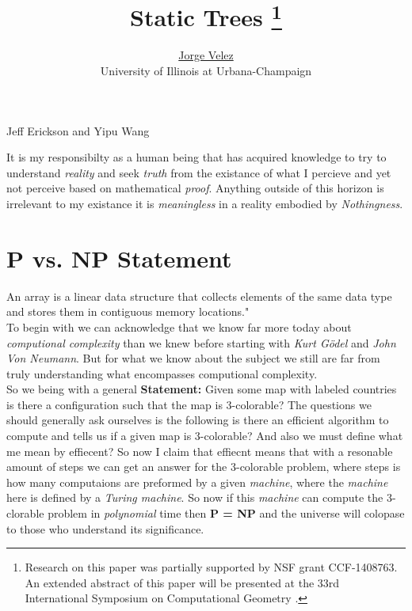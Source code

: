 \documentclass[twoside,11pt]{article}
\numberwithin{figure}{section}
\begin{document}
\pagestyle{myheadings}
    {Jeff Erickson and Yipu Wang}

\begin{titlepage}

\title{Static Trees%
\thanks{Research on this paper was partially supported by NSF grant CCF-1408763.  An extended abstract of this paper will be presented at the 33rd International Symposium on Computational Geometry \cite{ccwx}.}}

\author{\href{http://jeffe.cs.illinois.edu}{Jorge Velez}\\[1ex]
University of Illinois at Urbana-Champaign}

\maketitle
It is my responsibilty as a human being that has acquired knowledge to try to understand \emph{reality} and seek \emph{truth} from the existance of what I percieve and yet not perceive based
on mathematical \emph{proof}. Anything outside of this horizon is irrelevant to my existance it is \emph{meaningless} in a reality embodied by \emph{Nothingness}. 
\end{titlepage}

\tableofcontents

\section{P vs. NP Statement}
An array is a linear data structure that collects elements of the same data type and stores them in contiguous memory locations." \\ 
To begin with we can acknowledge that we know far more today about \emph{computional complexity} than we knew before starting with \emph{Kurt Gödel} and \emph{John Von Neumann}. 
But for what we know about the subject we still are far from truly understanding what encompasses computional complexity. \\

So we being with a general \textbf{Statement:} Given some map with labeled countries is there a configuration such that the map is 3-colorable?  The questions we should generally ask ourselves is the following 
is there an efficient algorithm to compute and tells us if a given map is 3-colorable? And also we must define what me mean by effiecent? So now I claim that effiecnt means that with a resonable amount of steps we 
can get an answer for the 3-colorable problem, where steps is how many computaions are preformed by a given \emph{machine}, where the \emph{machine} here is defined by a \emph{Turing machine}. So now if this \emph{machine} can
compute the 3-clorable problem in \emph{polynomial} time then \textbf{P = NP} and the universe will colopase to those who understand its significance. \\
\end{document}
